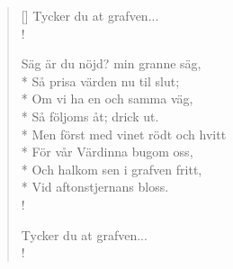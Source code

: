 \begin{verse}[\versewidth]
Tycker du at grafven...\\!

Säg är du nöjd? min granne säg,\\*
Så prisa värden nu til slut;\\*
Om vi ha en och samma väg,\\*
Så följoms åt; drick ut.\\*
Men först med vinet rödt och hvitt\\*
För vår Värdinna bugom oss,\\*
Och halkom sen i grafven fritt,\\*
Vid aftonstjernans bloss.\\!

Tycker du at grafven...\\!


\end{verse}

